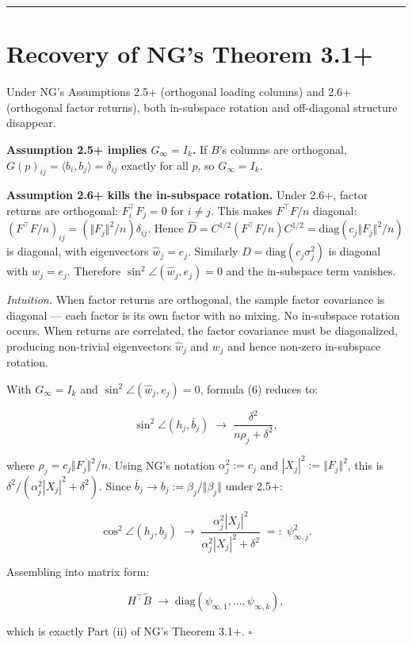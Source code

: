 \documentclass{article}
\theoremstyle{remark}
\begin{document}
\medskip\noindent\rule{\linewidth}{0.4pt}\medskip

\section{Recovery of NG's Theorem 3.1+}

Under NG's Assumptions 2.5+ (orthogonal loading columns) and 2.6+ (orthogonal factor returns), both in-subspace rotation and off-diagonal structure disappear.

\textbf{Assumption 2.5+ implies $G_\infty = I_k$.} If $B$'s columns are orthogonal, $G(p)_{ij} = \langle b_i, b_j\rangle = \delta_{ij}$ exactly for all $p$, so $G_\infty = I_k$.

\textbf{Assumption 2.6+ kills the in-subspace rotation.} Under 2.6+, factor returns are orthogonal: $F_i^\top F_j = 0$ for $i\ne j$. This makes $F^\top F/n$ diagonal: $(F^\top F/n)_{ij} = (\Vert F_j\Vert^2/n)\delta_{ij}$. Hence $\hat{D} = C^{1/2}(F^\top F/n)C^{1/2} = \mathrm{diag}(c_j\Vert F_j\Vert^2/n)$ is diagonal, with eigenvectors $\hat{w}_j = e_j$. Similarly $D = \mathrm{diag}(c_j\sigma_j^2)$ is diagonal with $w_j = e_j$. Therefore $\sin^2\angle(\hat{w}_j, e_j) = 0$ and the in-subspace term vanishes.

\textit{Intuition.} When factor returns are orthogonal, the sample factor covariance is diagonal — each factor is its own factor with no mixing. No in-subspace rotation occurs. When returns are correlated, the factor covariance must be diagonalized, producing non-trivial eigenvectors $\hat{w}_j$ and $w_j$ and hence non-zero in-subspace rotation.

With $G_\infty = I_k$ and $\sin^2\angle(\hat{w}_j, e_j) = 0$, formula (6) reduces to:

\[
\sin^2\angle(h_j, \bar{b}_j) \;\to\; \frac{\delta^2}{n\rho_j + \delta^2},
\]

where $\rho_j = c_j\Vert F_j\Vert^2/n$. Using NG's notation $\alpha_j^2 := c_j$ and $|X_j|^2 := \Vert F_j\Vert^2$, this is $\delta^2/(\alpha_j^2|X_j|^2+\delta^2)$. Since $\bar{b}_j \to b_j := \beta_j/\Vert \beta_j\Vert $ under 2.5+:

\[
\cos^2\angle(h_j, b_j) \;\to\; \frac{\alpha_j^2|X_j|^2}{\alpha_j^2|X_j|^2+\delta^2} \;=:\; \psi_{\infty,j}^2.
\]

Assembling into matrix form:

\[
H^\top\tilde{B} \;\to\; \mathrm{diag}(\psi_{\infty,1},\ldots,\psi_{\infty,k}),
\]

which is exactly Part (ii) of NG's Theorem 3.1+. $\square$
\end{document}
